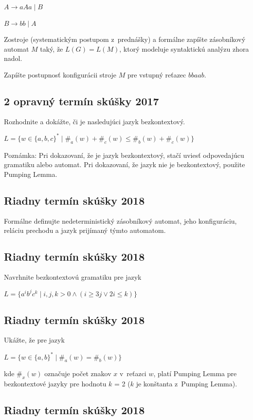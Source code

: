 \documentclass[11pt,a4paper]{article}
\begin{document}
		$A \rightarrow aAa \mid B$

		$B \rightarrow bb \mid A$

		Zostroje (systematickým postupom z~prednášky) a formálne zapíšte zásobníkový automat $M$ taký, že $L(G) = L(M)$, ktorý modeluje syntaktickú analýzu zhora nadol.

		Zapíšte postupnosť konfigurácii stroje $M$ pre vstupný reťazec $bbaab$.

		\subsection{2 opravný termín skúšky 2017}

		Rozhodnite a dokážte, či je nasledujúci jazyk bezkontextový.

		$L = \{w \in \{a,b,c\}^* \mid \#_a(w) + \#_c(w) \leq  \#_b(w) +  \#_c(w)\}$

		Poznámka: Pri dokazovaní, že je jazyk bezkontextový, stačí uviesť odpovedajúcu gramatiku alebo automat. Pri dokazovaní, že jazyk nie je bezkontextový, použite Pumping Lemma.

		\subsection{Riadny termín skúšky 2018}

		Formálne definujte nedeterministický zásobníkový automat, jeho konfiguráciu, reláciu prechodu a jazyk prijímaný týmto automatom.

		\subsection{Riadny termín skúšky 2018}

		Navrhnite bezkontextovú gramatiku pre jazyk

		$L = \{a^ib^jc^k \mid i,j,k > 0 \land (i \geq 3j \lor 2i \leq k)\}$

		\subsection{Riadny termín skúšky 2018}

		Ukážte, že pre jazyk

		$L = \{w \in \{a,b\}^* \mid \#_a(w) = \#_b(w)\}$

		kde $\#_x(w)$ označuje počet znakov $x$ v~reťazci $w$, platí Pumping Lemma pre bezkontextové jazyky pre hodnotu $k$ = 2 ($k$ je konštanta z~Pumping Lemma).

		\subsection{Riadny termín skúšky 2018}
\end{document}
